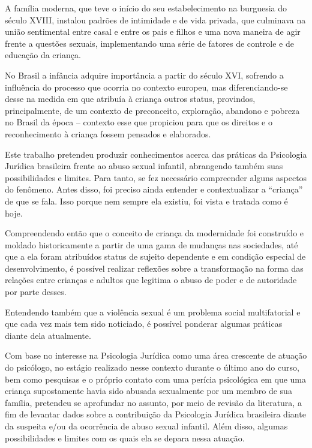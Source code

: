 A família moderna, que teve o início do seu estabelecimento na burguesia do século XVIII, instalou padrões de intimidade e de vida privada, que culminava na união sentimental entre casal e entre os pais e filhos \cite{aries11} e uma nova maneira de agir frente a questões sexuais, implementando uma série de fatores de controle e de educação da criança. 

No Brasil a infância adquire importância a partir do século XVI, sofrendo a influência do processo que ocorria no contexto europeu, mas diferenciando-se desse na medida em que atribuía à criança outros status, provindos, principalmente, de um contexto de preconceito, exploração, abandono e pobreza no Brasil da época – contexto esse que propiciou para que os direitos e o reconhecimento à criança fossem pensados e elaborados. 

Este trabalho pretendeu produzir conhecimentos acerca das práticas da Psicologia Jurídica brasileira frente ao abuso sexual infantil, abrangendo também suas possibilidades e limites. Para tanto, se fez necessário compreender alguns aspectos do fenômeno. Antes disso, foi preciso ainda entender e contextualizar a ``criança'' de que se fala. Isso porque nem sempre ela existiu, foi vista e tratada como é hoje. 

Compreendendo então que o conceito de criança da modernidade foi construído e moldado historicamente a partir de uma gama de mudanças nas sociedades, até que a ela foram atribuídos status de sujeito dependente e em condição especial de desenvolvimento, é possível realizar reflexões sobre a transformação na forma das relações entre crianças e adultos que legitima o abuso de poder e de autoridade por parte desses.

Entendendo também que a violência sexual é um problema social multifatorial e que cada vez mais tem sido noticiado, é possível ponderar algumas práticas diante dela atualmente.

Com base no interesse na Psicologia Jurídica como uma área crescente de atuação do psicólogo, no estágio realizado nesse contexto durante o último ano do curso, bem como pesquisas e o próprio contato com uma perícia psicológica em que uma criança supostamente havia sido abusada sexualmente por um membro de sua família, pretendeu se aprofundar no assunto, por meio de revisão da literatura, a fim de levantar dados sobre a contribuição da Psicologia Jurídica brasileira diante da suspeita e/ou da ocorrência de abuso sexual infantil. Além disso, algumas possibilidades e limites com os quais ela se depara nessa atuação. 

